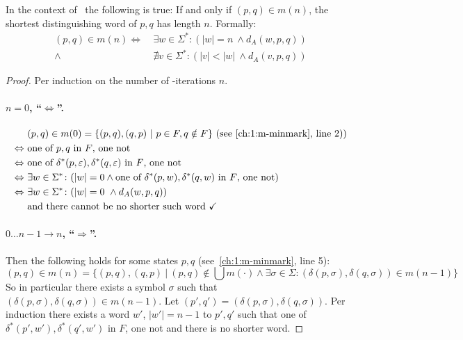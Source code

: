 \begin{lemma}\label{ch:3:semantics-of-m(n)}
    In the context of \CompDist\ the following is true: If and only if $(p,q)\in m(n)$, the shortest distinguishing word of $p,q$ has length $n$. Formally:
    \begin{align*}
        (p,q) \in m(n) \Longleftrightarrow\ &\exists w\in\Sigma^*\colon (|w| = n\ \land d_A(w, p, q))\\
        \land\ &\nexists v\in\Sigma^*\colon (|v| < |w|\ \land d_A(v, p, q))
    \end{align*}
\end{lemma}

\begin{proof}
	Per induction on the number of \CompDist-iterations $n$.
	
	\paragraph*{$n = 0$, ``$\Leftrightarrow$''.}
	\begin{align*}
		&(p,q) \in m(0) = \{ (p,q), (q,p)\ |\ p \in F, q \notin F \}\hfill\text{ (see~\ref{ch:1:m-minmark}, line 2))}\\
		\Leftrightarrow\ &\text{one of $p,q$ in $F$, one not}\\
		\Leftrightarrow\ &\text{one of $\delta^*(p, \varepsilon),\delta^*(q, \varepsilon)$ in $F$, one not}\\
		\Leftrightarrow\ &\exists w\in\Sigma^*\colon (|w|=0\land\text{one of $\delta^*(p, w),\delta^*(q, w)$ in $F$, one not})\\
		\Leftrightarrow\ &\exists w\in\Sigma^*\colon (|w| = 0\ \land d_A(w, p, q))\\
		&\text{and there cannot be no shorter such word }\checkmark
	\end{align*}
	
	\paragraph*{$0\ldots n-1 \rightarrow n$, ``$\Rightarrow$''.} 
	Then the following holds for some states $p,q$ (see~\ref{ch:1:m-minmark}, line 5):
	\begin{equation}\label{ch:3:eq:m(n)}
		(p,q) \in m(n) = \{ (p,q), (q,p)\ |\ (p,q) \notin \bigcup{m(\cdot)} \land \exists \sigma \in \Sigma \colon (\delta(p,\sigma), \delta(q,\sigma)) \in m(n-1) \}
	\end{equation}
	So in particular there exists a symbol $\sigma$ such that $(\delta(p,\sigma),\delta(q,\sigma)) \in m(n-1)$. Let $(p',q')=(\delta(p,\sigma),\delta(q,\sigma))$. Per induction there exists a word $w'$, $|w'|=n-1$ to $p',q'$ such that one of $\delta^*(p', w'),\delta^*(q', w')$ in $F$, one not and there is no shorter word.
	

\end{proof}
